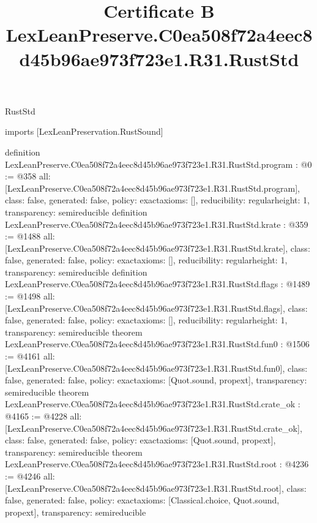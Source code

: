 \begin{lexlean}{RustStd}
\title{Certificate B LexLeanPreserve.C0ea508f72a4eec8d45b96ae973f723e1.R31.RustStd}
\begin{coremodule}
imports [LexLeanPreservation.RustSound]

definition LexLeanPreserve.C0ea508f72a4eec8d45b96ae973f723e1.R31.RustStd.program : @0 := @358 {
  all: [LexLeanPreserve.C0ea508f72a4eec8d45b96ae973f723e1.R31.RustStd.program],
  class: false,
  generated: false,
  policy: exact{axioms: []},
  reducibility: regular{height: 1},
  transparency: semireducible
}
definition LexLeanPreserve.C0ea508f72a4eec8d45b96ae973f723e1.R31.RustStd.krate : @359 := @1488 {
  all: [LexLeanPreserve.C0ea508f72a4eec8d45b96ae973f723e1.R31.RustStd.krate],
  class: false,
  generated: false,
  policy: exact{axioms: []},
  reducibility: regular{height: 1},
  transparency: semireducible
}
definition LexLeanPreserve.C0ea508f72a4eec8d45b96ae973f723e1.R31.RustStd.flags : @1489 := @1498 {
  all: [LexLeanPreserve.C0ea508f72a4eec8d45b96ae973f723e1.R31.RustStd.flags],
  class: false,
  generated: false,
  policy: exact{axioms: []},
  reducibility: regular{height: 1},
  transparency: semireducible
}
theorem LexLeanPreserve.C0ea508f72a4eec8d45b96ae973f723e1.R31.RustStd.fun0 : @1506 := @4161 {
  all: [LexLeanPreserve.C0ea508f72a4eec8d45b96ae973f723e1.R31.RustStd.fun0],
  class: false,
  generated: false,
  policy: exact{axioms: [Quot.sound, propext]},
  transparency: semireducible
}
theorem LexLeanPreserve.C0ea508f72a4eec8d45b96ae973f723e1.R31.RustStd.crate_ok : @4165 := @4228 {
  all: [LexLeanPreserve.C0ea508f72a4eec8d45b96ae973f723e1.R31.RustStd.crate_ok],
  class: false,
  generated: false,
  policy: exact{axioms: [Quot.sound, propext]},
  transparency: semireducible
}
theorem LexLeanPreserve.C0ea508f72a4eec8d45b96ae973f723e1.R31.RustStd.root : @4236 := @4246 {
  all: [LexLeanPreserve.C0ea508f72a4eec8d45b96ae973f723e1.R31.RustStd.root],
  class: false,
  generated: false,
  policy: exact{axioms: [Classical.choice, Quot.sound, propext]},
  transparency: semireducible
}


\end{coremodule}
\end{lexlean}
